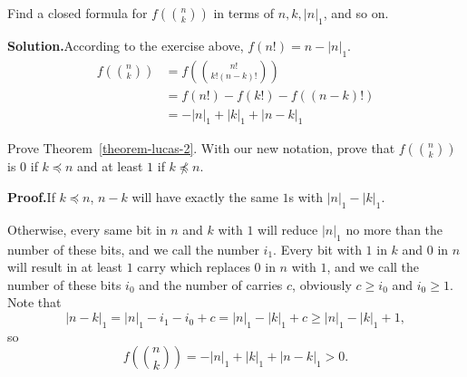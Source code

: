 \begin{exercise}
   Find a closed formula for $f\left({n \choose k}\right)$ in terms of $n, k, |n|_1$, and so on.
\end{exercise}

\textbf{Solution.}According to the exercise above, $f(n!)=n-|n|_1$.
$$
\begin{aligned}
    f\left({n \choose k}\right) & =f\left({{n!} \choose {k!(n-k)!}}\right)
    \\&=f(n!)-f(k!)-f((n-k)!)
    \\&=-|n|_1+|k|_1+|n-k|_1
\end{aligned}
$$

\begin{exercise}
 Prove Theorem~\ref{theorem-lucas-2}. With our new notation, prove that
 $f\left( {n \choose k}\right)$ is $0$ if $k \preceq n$ and at least $1$ if
 $k \not \preceq n$.
\end{exercise}

\textbf{Proof.}If $k \preceq n$, $n-k$ will have exactly the same $1$s with $|n|_1-|k|_1$. 

Otherwise, every same bit in $n$ and $k$ with $1$ will reduce $|n|_1$ no more than the number of these bits, and we call the number $i_1$. Every bit with $1$ in $k$ and $0$ in $n$ will result in at least $1$ carry which replaces $0$ in $n$ with $1$, and we call the number of these  bits $i_0$ and the number of carries $c$, obviously $c\geq i_0$ and $i_0\geq 1$. Note that $$|n-k|_1=|n|_1-i_1-i_0+c=|n|_1-|k|_1+c\geq |n|_1-|k|_1+1,$$ so $$f\left( {n \choose k}\right)=-|n|_1+|k|_1+|n-k|_1>0.$$

